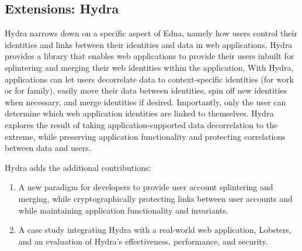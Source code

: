 \subsection{Extensions: Hydra}
Hydra narrows down on a specific aspect of Edna, namely how users control their
identities and links between their identities and data in web applications.
%
Hydra provides a library that enables web applications to provide their
users inbuilt for splintering and merging their web identities within the
application. With Hydra, applications can let users decorrelate data to
context-specific identities (\eg for work or for family), easily
move their data between identities, spin off new identities when necessary, and
merge identities if desired. Importantly, only the user can determine which
web application identities are linked to themselves.
%
Hydra explores the result of taking application-supported data
decorrelation to the extreme, while preserving application functionality and
protecting correlations between data and users. 

Hydra adds the additional contributions:
\begin{enumerate}[nosep] 
    \item A new paradigm for developers to provide user account splintering and
        merging, while cryptographically protecting links between user accounts
        and while maintaining application functionality and invariants.
    \item A case study integrating Hydra with a real-world web application,
        Lobsters, and an evaluation of Hydra's effectiveness, performance, and
        security.
\end{enumerate}

